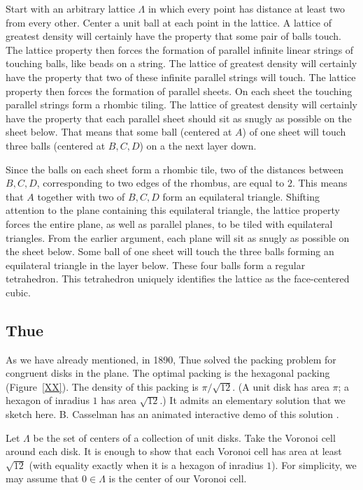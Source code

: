 Start with an arbitrary lattice $\Lambda$ in which every point has
distance at least two from every other.  Center a unit ball at each
point in the lattice.  A lattice of greatest density will certainly
have the property that some pair of balls touch.  The lattice property
then forces the formation of parallel infinite linear strings
of touching balls, like beads on a string.  The lattice of greatest
density will certainly have the property that two of these 
infinite parallel strings will touch.  The lattice property then forces
the formation of parallel sheets.  On each sheet the touching parallel
strings form a rhombic tiling.  The lattice of greatest density
will certainly have the property that each parallel sheet should sit
as snugly as possible on the sheet below.  That means that some ball (centered at $A$) of
one sheet will touch three balls (centered at $B,C,D$) 
on a the next layer down.

Since the balls on each sheet form a rhombic tile, two of the distances
between $B,C,D$, corresponding to two edges of the rhombus, 
are equal to $2$.  This means that $A$ together with
two of $B,C,D$ form an equilateral triangle.  Shifting attention to the plane
containing this equilateral triangle, the lattice property forces the entire
plane, as well as parallel planes, to be tiled with equilateral triangles.
From the earlier argument, each plane will sit as snugly as possible on
the sheet below.  Some ball of one sheet will touch the three balls forming
an equilateral triangle in the layer below.  These four balls form a regular
tetrahedron.  This tetrahedron 
uniquely identifies the lattice as the face-centered cubic.






\subsection{Thue}


As we have already mentioned, in 1890, 
Thue solved the  packing problem for congruent disks in the plane.
The optimal packing is the hexagonal packing (Figure~\ref{XX}). %
The density of this packing is $\pi/\sqrt{12}$.  (A unit disk has
area $\pi$; a hexagon of inradius $1$ has area $\sqrt{12}$.)
It admits an elementary solution that we sketch here.  B. Casselman
has an animated interactive demo of this solution \cite{BC00}.

Let $\Lambda$ be the set of centers of a collection of unit disks.
Take the Voronoi cell around each disk.  It is enough to show that
each Voronoi cell has area at least $\sqrt{12}$ (with equality exactly
when it is a hexagon of inradius $1$).  For simplicity,
we may assume that $0\in\Lambda$ is the center of our Voronoi cell.  

